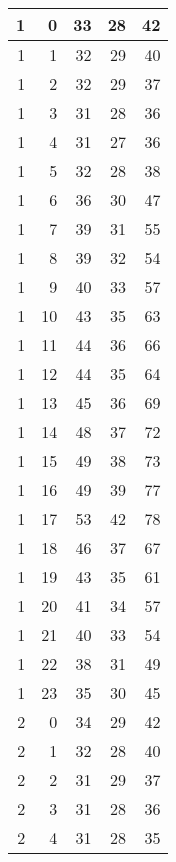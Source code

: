     \begin{longtable}{|r|r|r|r|r|}
		\centering
		
    1     & 0     & 33    & 28    & 42 \\\hline
    1     & 1     & 32    & 29    & 40 \\\hline
    1     & 2     & 32    & 29    & 37 \\\hline
    1     & 3     & 31    & 28    & 36 \\\hline
    1     & 4     & 31    & 27    & 36 \\\hline
    1     & 5     & 32    & 28    & 38 \\\hline
    1     & 6     & 36    & 30    & 47 \\\hline
    1     & 7     & 39    & 31    & 55 \\\hline
    1     & 8     & 39    & 32    & 54 \\\hline
    1     & 9     & 40    & 33    & 57 \\\hline
    1     & 10    & 43    & 35    & 63 \\\hline
    1     & 11    & 44    & 36    & 66 \\\hline
    1     & 12    & 44    & 35    & 64 \\\hline
    1     & 13    & 45    & 36    & 69 \\\hline
    1     & 14    & 48    & 37    & 72 \\\hline
    1     & 15    & 49    & 38    & 73 \\\hline
    1     & 16    & 49    & 39    & 77 \\\hline
    1     & 17    & 53    & 42    & 78 \\\hline
    1     & 18    & 46    & 37    & 67 \\\hline
    1     & 19    & 43    & 35    & 61 \\\hline
    1     & 20    & 41    & 34    & 57 \\\hline
    1     & 21    & 40    & 33    & 54 \\\hline
    1     & 22    & 38    & 31    & 49 \\\hline
    1     & 23    & 35    & 30    & 45 \\\hline
    2     & 0     & 34    & 29    & 42 \\\hline
    2     & 1     & 32    & 28    & 40 \\\hline
    2     & 2     & 31    & 29    & 37 \\\hline
    2     & 3     & 31    & 28    & 36 \\\hline
    2     & 4     & 31    & 28    & 35 \\\hline

\end{longtable}
